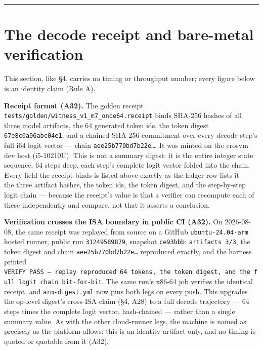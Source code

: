 \documentclass[11pt]{article}
\begin{document}
\begin{center}\rule{0.5\linewidth}{0.5pt}\end{center}

\section{The decode receipt and bare-metal verification}\label{the-decode-receipt-and-bare-metal-verification}

This section, like §4, carries no timing or throughput number; every figure below is an identity
claim (Rule A).

\textbf{Receipt format (A32).} The golden receipt \texttt{tests/golden/witness\_v1\_m7\_once64.receipt} binds
SHA-256 hashes of all three model artifacts, the 64 generated token ids, the token digest
\texttt{67e8c0a96abc04e1}, and a chained SHA-256 commitment over every decode step's full i64 logit
vector --- chain \texttt{aee25b770bd7b22e…}. It was minted on the crosvm dev host (i5-10210U). This is not
a summary digest: it is the entire integer state sequence, 64 steps deep, each step's complete
logit vector folded into the chain. Every field the receipt binds is listed above exactly as the
ledger row lists it --- the three artifact hashes, the token ids, the token digest, and the
step-by-step logit chain --- because the receipt's value is that a verifier can recompute each of
these independently and compare, not that it asserts a conclusion.

\textbf{Verification crosses the ISA boundary in public CI (A32).} On 2026-08-08, the same receipt
was replayed from source on a GitHub \texttt{ubuntu-24.04-arm} hosted runner, public run \texttt{31249589879},
snapshot \texttt{ce93bbb}: \texttt{artifacts\ 3/3}, the token digest and chain \texttt{aee25b770bd7b22e…} reproduced
exactly, and the harness printed \texttt{VERIFY\ PASS\ —\ replay\ reproduced\ 64\ tokens,\ the\ token\ digest,\ and\ the\ full\ logit\ chain\ bit-for-bit}. The same run's x86-64 job verifies the identical receipt,
and \texttt{arm-digest.yml} now pins both legs on every push. This upgrades the op-level digest's
cross-ISA claim (§4, A28) to a full decode trajectory --- 64 steps times the complete logit vector,
hash-chained --- rather than a single summary value. As with the other cloud-runner legs, the
machine is named as precisely as the platform allows; this is an identity artifact only, and no
timing is quoted or quotable from it (A32).
\end{document}
